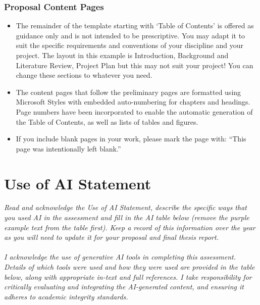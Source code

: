 \documentclass[12pt,openany,a4paper]{book}
\newcommand{\purple}[1]{\textcolor{topicpurple}{\textit{#1}}}
\begin{document}
{\subsection*{Proposal Content Pages}
\begin{itemize}
  \item The remainder of the template starting with `Table of Contents' is offered as guidance only and is not intended to be prescriptive. You may adapt it to suit the specific requirements and conventions of your discipline and your project. The layout in this example is Introduction, Background and Literature Review, Project Plan but this may not suit your project! You can change these sections to whatever you need.
  \item The content pages that follow the preliminary pages are formatted using Microsoft Styles with embedded auto-numbering for chapters and headings. Page numbers have been incorporated to enable the automatic generation of the Table of Contents, as well as lists of tables and figures.
  \item If you include blank pages in your work, please mark the page with: ``This page was intentionally left blank.''
\end{itemize}

}




\chapter{Use of AI Statement}
\purple{Read and acknowledge the Use of AI Statement, describe the specific ways that you used AI in the assessment and fill in the AI table below (remove the purple example text from the table first). Keep a record of this information over the year as you will need to update it for your proposal and final thesis report.}

\subsubsection*{}
\noindent \textit{I acknowledge the use of generative AI tools in completing this assessment. Details of which tools were used and how they were used are provided in the table below, along with appropriate in-text and full references. I take responsibility for critically evaluating and integrating the AI-generated content, and ensuring it adheres to academic integrity standards.}
\end{document}
